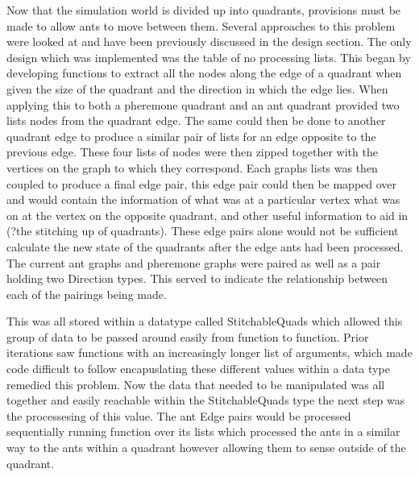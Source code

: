 \documentclass[main.tex]{subfiles}
\begin{document}
Now that the simulation world is divided up into quadrants, provisions must be made to allow ants to move between them. Several approaches to this problem were looked at and have been previously discussed in the design section. The only design which was implemented was the table of no processing lists. This began by developing functions to extract all the nodes along the edge of a quadrant when given the size of the quadrant and the direction in which the edge lies. When applying this to both a pheremone quadrant and an ant quadrant provided two lists nodes from the quadrant edge. The same could then be done to another quadrant edge to produce a similar pair of lists for an edge opposite to the previous edge.%
These four lists of nodes were then zipped together with the vertices on the graph to which they correspond. Each graphs lists was then coupled to produce a final edge pair, this edge pair could then be mapped over and would contain the information of what was at a particular vertex what was on at the vertex on the opposite quadrant, and other useful information to aid in (?the stitching up of quadrants). These edge pairs alone would not be sufficient calculate the new state of the quadrants after the edge ants had been processed. The current ant graphs and pheremone graphs were paired as well as a pair holding two Direction types. This served to indicate the relationship between each of the pairings being made.

This was all stored within a datatype called StitchableQuads which allowed this group of data to be passed around easily from function to function. Prior iterations saw functions with an increasingly longer list of arguments, which made code difficult to follow encapuslating these different values within a data type remedied this problem. Now the data that needed to be manipulated was all together and easily reachable within the StitchableQuads type the next step was the processesing of this value. The ant Edge pairs would be processed sequentially running function over its lists which processed the ants in a similar way to the ants within a quadrant however allowing them to sense outside of the quadrant.




\end{document}
